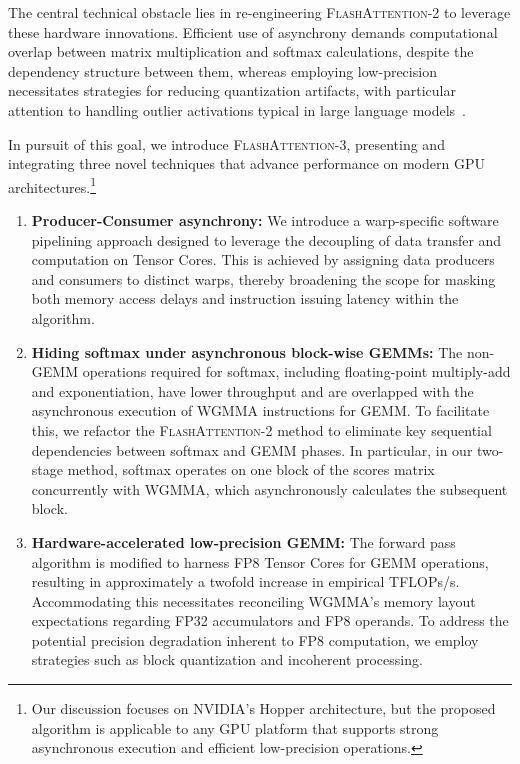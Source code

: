 The central technical obstacle lies in re-engineering \textsc{FlashAttention-2} to leverage these hardware innovations. Efficient use of asynchrony demands computational overlap between matrix multiplication and softmax calculations, despite the dependency structure between them, whereas employing low-precision necessitates strategies for reducing quantization artifacts, with particular attention to handling outlier activations typical in large language models~\citep{dettmers2208llm, sun2024massive}.

In pursuit of this goal, we introduce \textsc{FlashAttention-3}, presenting and integrating three novel techniques that advance performance on modern GPU architectures.\footnote{Our discussion focuses on NVIDIA's Hopper architecture, but the proposed algorithm is applicable to any GPU platform that supports strong asynchronous execution and efficient low-precision operations.}

\begin{enumerate}

\item \textbf{Producer-Consumer asynchrony:} We introduce a warp-specific software pipelining approach designed to leverage the decoupling of data transfer and computation on Tensor Cores. This is achieved by assigning data producers and consumers to distinct warps, thereby broadening the scope for masking both memory access delays and instruction issuing latency within the algorithm.

\item \textbf{Hiding softmax under asynchronous block-wise GEMMs:} The non-GEMM operations required for softmax, including floating-point multiply-add and exponentiation, have lower throughput and are overlapped with the asynchronous execution of WGMMA instructions for GEMM. To facilitate this, we refactor the \textsc{FlashAttention-2} method to eliminate key sequential dependencies between softmax and GEMM phases. In particular, in our two-stage method, softmax operates on one block of the scores matrix concurrently with WGMMA, which asynchronously calculates the subsequent block.

\item \textbf{Hardware-accelerated low-precision GEMM:} The forward pass algorithm is modified to harness FP8 Tensor Cores for GEMM operations, resulting in approximately a twofold increase in empirical TFLOPs/s. Accommodating this necessitates reconciling WGMMA's memory layout expectations regarding FP32 accumulators and FP8 operands. To address the potential precision degradation inherent to FP8 computation, we employ strategies such as block quantization and incoherent processing.
\end{enumerate}

